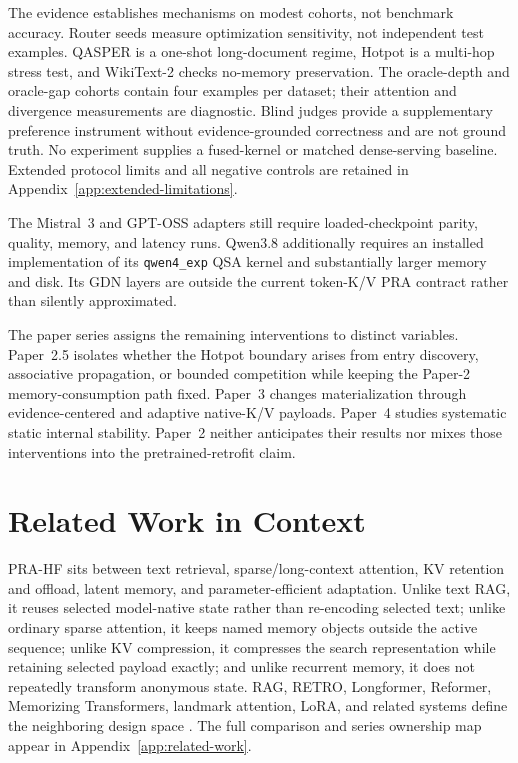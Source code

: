\documentclass[11pt]{article}
\begin{document}
The evidence establishes mechanisms on modest cohorts, not benchmark accuracy.  Router seeds
measure optimization sensitivity, not independent test examples.  QASPER is a one-shot
long-document regime, Hotpot is a multi-hop stress test, and WikiText-2 checks no-memory
preservation.  The oracle-depth and oracle-gap cohorts contain four examples per dataset; their
attention and divergence measurements are diagnostic. Blind judges provide a supplementary
preference instrument without evidence-grounded correctness and are not ground truth. No experiment supplies a fused-kernel or matched dense-serving
baseline.  Extended protocol limits and all negative controls are retained in
Appendix~\ref{app:extended-limitations}.

The Mistral~3 and GPT-OSS adapters still require loaded-checkpoint parity, quality, memory, and
latency runs. Qwen3.8 additionally requires an installed implementation of its
\texttt{qwen4\_exp} QSA kernel and substantially larger memory and disk. Its GDN layers are outside
the current token-K/V PRA contract rather than silently approximated.

The paper series assigns the remaining interventions to distinct variables. Paper~2.5 isolates
whether the Hotpot boundary arises from entry discovery, associative propagation, or bounded
competition while keeping the Paper-2 memory-consumption path fixed. Paper~3 changes
materialization through evidence-centered and adaptive native-K/V payloads. Paper~4 studies
systematic static internal stability. Paper~2 neither anticipates their results nor mixes those
interventions into the pretrained-retrofit claim.

\section{Related Work in Context}

PRA-HF sits between text retrieval, sparse/long-context attention, KV retention and offload,
latent memory, and parameter-efficient adaptation.  Unlike text RAG, it reuses selected
model-native state rather than re-encoding selected text; unlike ordinary sparse attention, it
keeps named memory objects outside the active sequence; unlike KV compression, it compresses the
search representation while retaining selected payload exactly; and unlike recurrent memory, it
does not repeatedly transform anonymous state.  RAG, RETRO, Longformer, Reformer, Memorizing
Transformers, landmark attention, LoRA, and related systems define the neighboring design space
\cite{lewis2020rag,borgeaud2022retro,beltagy2020longformer,kitaev2020reformer,
wu2022memorizing,mohtashami2023landmark,hu2022lora}.
The full comparison and series ownership map appear in Appendix~\ref{app:related-work}.
\end{document}
